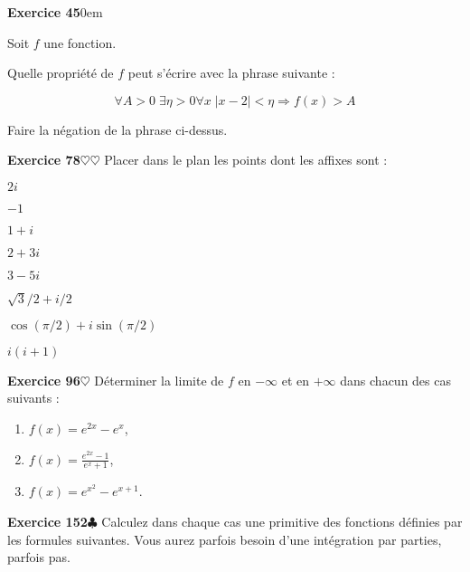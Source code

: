 ﻿\documentclass[11pt,a4paper]{amsart}
\theoremstyle{theorem}
\theoremstyle{definition}
\newcommand{\coeur}{$\heartsuit$}
\newcommand{\ccoeur}{$\heartsuit\heartsuit$}
\newcommand{\trefle}{$\clubsuit$}
\newcounter{qcounter}
\newcounter{qscounter}
\newcommand{\exosd}[1]{\vspace{.3cm}\hangindent0em\hangafter=0%
\noindent{\textbf{Exercice .} \textit{#1}}}
\begin{document}
\setcounter{qcounter}{0} \setcounter{qscounter}{0}\textbf{Exercice 45}\exosd{5min}

Soit $f$ une fonction. 

\question Quelle propriété de $f$ peut s'écrire avec la phrase suivante :

$$\forall A>0\;\exists \eta>0\forall x\; |x-2|<\eta\Rightarrow f(x)>A$$

\question Faire la négation de la phrase ci-dessus.

\setcounter{qcounter}{0} \setcounter{qscounter}{0}\textbf{Exercice 78}{\ccoeur}
Placer dans le plan les points dont les affixes sont :
\begin{enumerate}
\begin{multicols}{2}
\item $2i$
\item $-1$
\item $1+i$
\item $2+3i$
\item $3-5i$
\item $\sqrt{3}/2+i/2$
\item $\cos(\pi/2)+i\sin(\pi/2)$
\item $i(i+1)$
\end{multicols}
\end{enumerate}

\setcounter{qcounter}{0} \setcounter{qscounter}{0}\textbf{Exercice 96}{\coeur} Déterminer la limite de $f$ en $-\infty$ et en $+\infty$ dans chacun des cas suivants : 

\begin{multicols}{2}
\begin{enumerate}
\item $f(x)=e^{2x}-e^x$,
\item $f(x)=\frac{e^{2x}-1}{e^x+1}$,
\item $f(x)=e^{x^2}-e^{x+1}$.
\end{enumerate}
\end{multicols}

\setcounter{qcounter}{0} \setcounter{qscounter}{0}\textbf{Exercice 152}{\trefle}
Calculez dans chaque cas une primitive des fonctions définies par les formules suivantes. Vous  aurez parfois besoin d'une intégration par parties, parfois pas.
\end{document}
